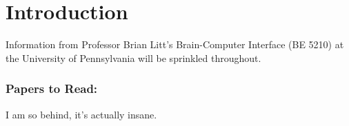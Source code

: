 \section{Introduction}

Information from Professor Brian Litt's Brain-Computer Interface (BE 5210) at the University of Pennsylvania will be sprinkled throughout. 










\subsubsection{Papers to Read:}

I am so behind, it's actually insane.\newline

